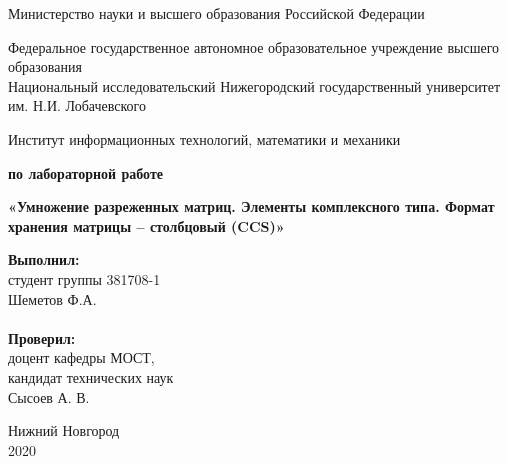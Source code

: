 \documentclass{report}
\begin{document}
	\begin{titlepage}
		
		\begin{center}
			Министерство науки и высшего образования Российской Федерации
		\end{center}
		
		\begin{center}
			Федеральное государственное автономное образовательное учреждение высшего образования \\
			Национальный исследовательский Нижегородский государственный университет им. Н.И. Лобачевского
		\end{center}
		
		\begin{center}
			Институт информационных технологий, математики и механики
		\end{center}
		
		\vspace{4em}
		
		\begin{center}
			\textbf{ по лабораторной работе} \\
		\end{center}
		\begin{center}
			\textbf{\Large«Умножение разреженных матриц. Элементы комплексного типа. Формат хранения матрицы – столбцовый (CCS)»} \\
		\end{center}
		
		\vspace{11em}
		\hfill\parbox{6.5cm}{
			\textbf{Выполнил:} \\ студент группы 381708-1 \\ Шеметов Ф.А.\\
			\\
			\textbf{Проверил:}\\ доцент кафедры МОСТ, \\ кандидат технических наук \\ Сысоев А. В.
		}
		
		\vspace{\fill}
		\begin{center} Нижний Новгород \\ 2020 \end{center}
		
	\end{titlepage}
	
	\setcounter{page}{2}
	
	\tableofcontents
	\newpage
	
\end{document}

